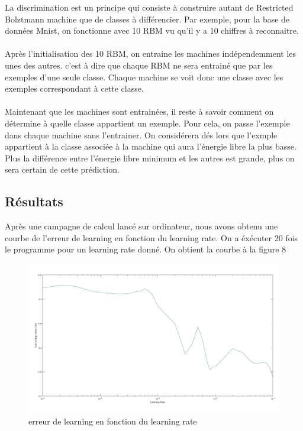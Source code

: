 \documentclass[a4paper,twoside]{report}
\begin{document}
La discrimination est un principe qui consiste à construire autant de Restricted Bolztmann machine que de classes à différencier. Par exemple, pour la base de données Mnist, on fonctionne avec 10 RBM vu qu'il y a 10 chiffres à reconnaitre.

\paragraph{} Après l'initialisation des 10 RBM, on entraine les machines indépendemment les unes des autres. c'est à dire que chaque RBM ne sera entrainé que par les exemples d'une seule classe. Chaque machine se voit donc une classe avec les exemples correspondant à cette classe.

\paragraph{} Maintenant que les machines sont entrainées, il reste à savoir comment on détermine à quelle classe appartient un exemple. Pour cela, on passe l'exemple dans chaque machine sans l'entrainer. On considérera dés lors que l'exmple appartient à la classe associée à la machine qui aura l'énergie libre la plus basse. Plus la différence entre l'énergie libre minimum et les autres est grande, plus on sera certain de cette prédiction.



\subsection{Résultats}

Après une campagne de calcul lancé sur ordinateur, nous avons obtenu une courbe de l'erreur de learning en fonction du learning rate. On a éxécuter 20 fois le programme pour un learning rate donné. On obtient la courbe à la figure 8

\begin{figure}[!h]
	\begin{center}
		\includegraphics[scale=0.27]{Images/courbe_discriminative.jpg} 
		\caption{erreur de learning en fonction du learning rate} 
	\end{center}
\end{figure}
\end{document}
